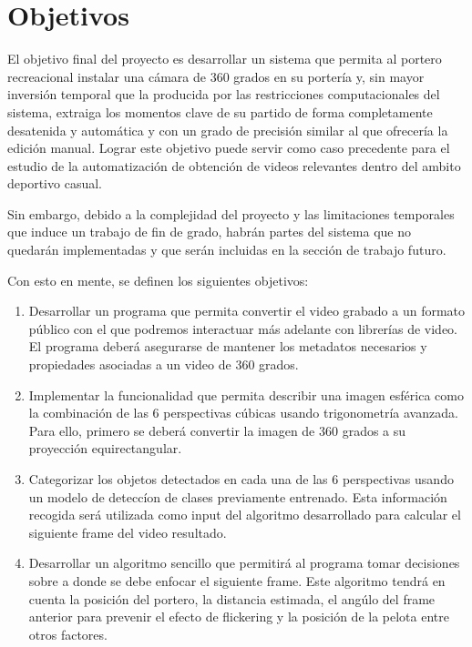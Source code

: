 \section[Objetivos]{Objetivos}
El objetivo final del proyecto es desarrollar un sistema que permita al portero recreacional instalar una cámara de 360 grados en su portería y, sin mayor inversión temporal que la producida por las restricciones computacionales del sistema, extraiga los momentos clave de su partido de forma completamente desatenida y automática y con un grado de precisión similar al que ofrecería la edición manual. Lograr este objetivo puede servir como caso precedente para el estudio de la automatización de obtención de videos relevantes dentro del ambito deportivo casual.

Sin embargo, debido a la complejidad del proyecto y las limitaciones temporales que induce un trabajo de fin de grado, habrán partes del sistema que no quedarán implementadas y que serán incluidas en la sección de trabajo futuro.


Con esto en mente, se definen los siguientes objetivos:

\begin{enumerate}
	\item Desarrollar un programa que permita convertir el video grabado a un formato público con el que podremos interactuar más adelante con librerías de video. El programa deberá asegurarse de mantener los metadatos necesarios y propiedades asociadas a un video de 360 grados.

	\item Implementar la funcionalidad que permita describir una imagen esférica como la combinación de las 6 perspectivas cúbicas usando trigonometría avanzada. Para ello, primero se deberá convertir la imagen de 360 grados a su proyección equirectangular.
	\item Categorizar los objetos detectados en cada una de las 6 perspectivas usando un modelo de deteccíon de clases previamente entrenado. Esta información recogida será utilizada como input del algoritmo desarrollado para calcular el siguiente frame del video resultado.
	
	\item Desarrollar un algoritmo sencillo que permitirá al programa tomar decisiones sobre a donde se debe enfocar el siguiente frame. Este algoritmo tendrá en cuenta la posición del portero, la distancia estimada, el angúlo del frame anterior para prevenir el efecto de flickering y la posición de la pelota entre otros factores.
	  
\end{enumerate}

